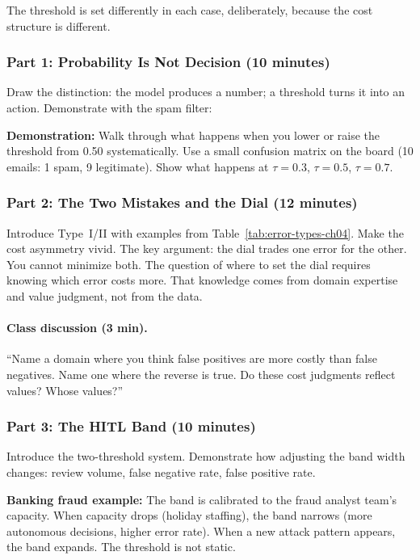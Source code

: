 The threshold is set differently in each case, deliberately, because the cost structure is different.

\subsubsection{Part 1: Probability Is Not Decision (10 minutes)}

Draw the distinction: the model produces a number; a threshold turns it into an action. Demonstrate with the spam filter:

\begin{trythis}
\textbf{Demonstration:} Walk through what happens when you lower or raise the threshold from 0.50 systematically. Use a small confusion matrix on the board (10 emails: 1 spam, 9 legitimate). Show what happens at $\tau = 0.3$, $\tau = 0.5$, $\tau = 0.7$.
\end{trythis}

\subsubsection{Part 2: The Two Mistakes and the Dial (12 minutes)}

Introduce Type~I/II with examples from Table~\ref{tab:error-types-ch04}. Make the cost asymmetry vivid. The key argument: the dial trades one error for the other. You cannot minimize both. The question of where to set the dial requires knowing which error costs more. That knowledge comes from domain expertise and value judgment, not from the data.

\paragraph{Class discussion (3 min).} ``Name a domain where you think false positives are more costly than false negatives. Name one where the reverse is true. Do these cost judgments reflect values? Whose values?''

\subsubsection{Part 3: The HITL Band (10 minutes)}

Introduce the two-threshold system. Demonstrate how adjusting the band width changes: review volume, false negative rate, false positive rate.

\textbf{Banking fraud example:} The band is calibrated to the fraud analyst team's capacity. When capacity drops (holiday staffing), the band narrows (more autonomous decisions, higher error rate). When a new attack pattern appears, the band expands. The threshold is not static.

